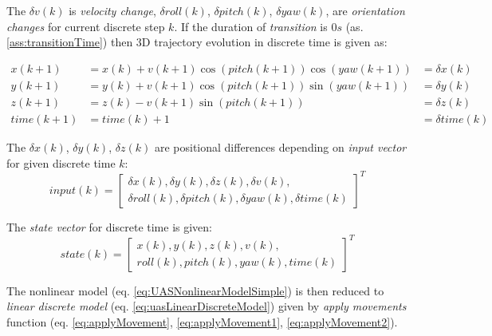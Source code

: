\noindent The $\delta v(k)$ is \emph{velocity change}, $\delta roll(k)$, $\delta pitch(k)$, $\delta yaw(k)$, are \emph{orientation changes} for current discrete step $k$. If the duration of \emph{transition} is $0 s$ (as. \ref{ass:transitionTime}) then 3D trajectory evolution in discrete time is given as: 

\begin{equation}\label{eq:applyMovement2}
    \begin{aligned}
        x(k+1)&= x(k) + v(k+1) \cos(pitch(k+1)) \cos(yaw(k+1)) & = \delta x(k)\\
        y(k+1)&= y(k) + v(k+1) \cos(pitch(k+1)) \sin(yaw(k+1)) & = \delta y(k)\\
        z(k+1)&= z(k) - v(k+1) \sin(pitch(k+1))                & = \delta z(k)\\
        time(k+1)& = time(k)+1                                & = \delta time(k)
    \end{aligned}    
\end{equation}

\noindent The $\delta x(k)$, $\delta y(k)$, $\delta z(k)$ are positional differences depending on \emph{input vector} for given discrete time $k$:
\begin{equation}\label{eq:ourImput}
    input(k) = \left[
                    \begin{gathered}
                    \delta x(k), \delta y(k), \delta z(k), \delta v (k),\\
                    \delta roll (k), \delta pitch(k), \delta yaw(k),\delta time (k)
                    \end{gathered} 
                \right]^T
\end{equation}

\noindent The \emph{state vector} for discrete time is given:
\begin{equation}\label{eq:ourState}
    state(k) = \left[
                    \begin{gathered}
                     x(k),  y(k),  z(k),  v (k),\\
                     roll (k),  pitch(k),  yaw(k), time (k)
                    \end{gathered} 
                \right]^T
\end{equation}

\noindent The nonlinear model (eq. \ref{eq:UASNonlinearModelSimple}) is then reduced to \emph{linear discrete model} (eq. \ref{eq:uasLinearDiscreteModel}) given by \emph{apply movements} function (eq. \ref{eq:applyMovement}, \ref{eq:applyMovement1}, \ref{eq:applyMovement2}).

